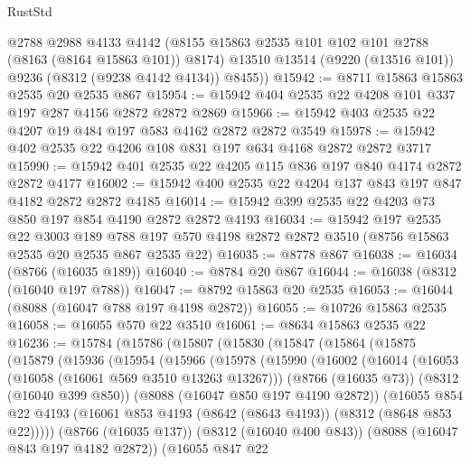 \begin{lexlean}{RustStd}
\begin{coremodule}
        @2788
        @2988
        @4133
        @4142
        (@8155 @15863 @2535 @101 @102 @101 @2788 (@8163 (@8164 @15863 @101)) @8174)
        @13510
        @13514
        (@9220 (@13516 @101))
        @9236
        (@8312 (@9238 @4142 @4134))
        @8455))
@15942 := @8711 @15863 @15863 @2535 @20 @2535 @867
@15954 := @15942 @404 @2535 @22 @4208 @101 @337 @197 @287 @4156 @2872 @2872 @2869
@15966 := @15942 @403 @2535 @22 @4207 @19 @484 @197 @583 @4162 @2872 @2872 @3549
@15978 := @15942 @402 @2535 @22 @4206 @108 @831 @197 @634 @4168 @2872 @2872 @3717
@15990 := @15942 @401 @2535 @22 @4205 @115 @836 @197 @840 @4174 @2872 @2872 @4177
@16002 := @15942 @400 @2535 @22 @4204 @137 @843 @197 @847 @4182 @2872 @2872 @4185
@16014 := @15942 @399 @2535 @22 @4203 @73 @850 @197 @854 @4190 @2872 @2872 @4193
@16034 := @15942
    @197
    @2535
    @22
    @3003
    @189
    @788
    @197
    @570
    @4198
    @2872
    @2872
    @3510
    (@8756 @15863 @2535 @20 @2535 @867 @2535 @22)
@16035 := @8778 @867
@16038 := @16034 (@8766 (@16035 @189))
@16040 := @8784 @20 @867
@16044 := @16038 (@8312 (@16040 @197 @788))
@16047 := @8792 @15863 @20 @2535
@16053 := @16044 (@8088 (@16047 @788 @197 @4198 @2872))
@16055 := @10726 @15863 @2535
@16058 := @16055 @570 @22 @3510
@16061 := @8634 @15863 @2535 @22
@16236 := @15784
    (@15786
      (@15807
        (@15830
          (@15847
            (@15864
              (@15875
                (@15879
                  (@15936
                    (@15954
                      (@15966
                        (@15978
                          (@15990
                            (@16002
                              (@16014
                                (@16053 (@16058 (@16061 @569 @3510 @13263 @13267)))
                                (@8766 (@16035 @73))
                                (@8312 (@16040 @399 @850))
                                (@8088 (@16047 @850 @197 @4190 @2872))
                                (@16055
                                  @854
                                  @22
                                  @4193
                                  (@16061
                                    @853
                                    @4193
                                    (@8642 (@8643 @4193))
                                    (@8312 (@8648 @853 @22)))))
                              (@8766 (@16035 @137))
                              (@8312 (@16040 @400 @843))
                              (@8088 (@16047 @843 @197 @4182 @2872))
                              (@16055
                                @847
                                @22

\end{coremodule}
\end{lexlean}
